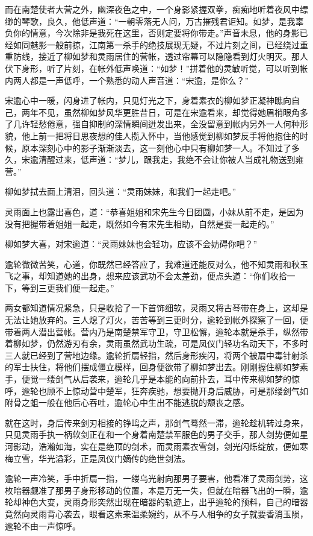 而在南楚使者大营之外，幽深夜色之中，一个身影紧握双拳，痴痴地听着夜风中缥缈的琴歌，良久，他低声道：“一朝零落无人问，万古摧残君讵知。如梦，是我辜负你的情意，今次除非是我死在这里，否则定要将你带走。”声音未息，他的身影已经如同魅影一般前掠，江南第一杀手的绝技展现无疑，不过片刻之间，已经绕过重重防线，接近了柳如梦和灵雨居住的营帐，透过帘幕可以隐隐看到灯火明灭。那人伏下身形，听了片刻，在帐外低声唤道：“如梦！”拼着他的灵敏听觉，可以听到帐内两人都是一声低呼，一个熟悉的动人声音道：“宋逾，是你么？”

宋逾心中一暖，闪身进了帐内，只见灯光之下，身着素衣的柳如梦正凝神瞧向自己，两年不见，虽然柳如梦风华更胜昔日，可是在宋逾看来，却觉得她眉梢眼角多了几许轻愁倦意，强自抑制的深情瞬间迸发出来，全没留意到帐内另外一人何种形貌，他上前一把将日思夜想的佳人揽入怀中，当他感觉到柳如梦反手将他抱住的时候，原本深刻心中的影子渐渐淡去，这一刻他心中只有柳如梦一人。不知过了多久，宋逾清醒过来，低声道：“梦儿，跟我走，我绝不会让你被人当成礼物送到雍营。”

柳如梦拭去面上清泪，回头道：“灵雨妹妹，和我们一起走吧。”

灵雨面上也露出喜色，道：“恭喜姐姐和宋先生今日团圆，小妹从前不走，是因为没有把握带着姐姐一起走，既然如今有宋先生相助，自然是要一起走的。”

柳如梦大喜，对宋逾道：“灵雨妹妹也会轻功，应该不会妨碍你吧？”

逾轮微微苦笑，心道，你既然已经答应了，我难道还能反对么，他不知灵雨和秋玉飞之事，却知道她的出身，想来应该武功不会太差劲，便点头道：“你们收拾一下，等到三更我们便一起走。”

两女都知道情况紧急，只是收拾了一下首饰细软，灵雨又将古琴带在身上，这却是无法让她放弃的。三人熄了灯火，苦苦等到三更时分，逾轮到帐外探察了一回，便带着两人潜出营帐。营内乃是南楚禁军守卫，守卫松懈，逾轮本就是杀手，纵然带着柳如梦，仍然游刃有余，灵雨虽然武功生疏，可是凤仪门轻功名动天下，不多时三人就已经到了营地边缘。逾轮折扇轻指，然后身形疾闪，将两个被扇中毒针射杀的军士扶住，将他们摆成僵立模样，回身便欲带了柳如梦出去。刚刚握住柳如梦素手，便觉一缕剑气从后袭来，逾轮几乎是本能的向前扑去，耳中传来柳如梦的惊呼，逾轮也顾不上惊动营中楚军，狂奔疾驰，想要抛开身后威胁，可是那缕剑气如附骨之蛆一般在他后心吞吐，逾轮心中生出不能逃脱的颓丧之感。

就在这时，身后传来剑刃相接的铮鸣之声，那剑气蓦然一滞，逾轮趁机转过身来，只见灵雨手执一柄软剑正在和一个身着南楚禁军服色的男子交手，那人剑势便如星河影动，浩瀚如海，实在是绝顶的剑术，而灵雨素衣雪剑，剑光闪烁绽放，便如寒梅立雪，华光溢彩，正是凤仪门嫡传的绝世剑法。

逾轮一声冷笑，手中折扇一指，一缕乌光射向那男子要害，他看准了灵雨剑势，这枚暗器觑准了那男子身形移动的位置，本是万无一失，但就在暗器飞出的一瞬，逾轮却神色大变，灵雨身形突然出现在暗器的轨迹上，出乎逾轮的预料，自己的暗器竟然向灵雨背心袭去，眼看这素来温柔婉约，从不与人相争的女子就要香消玉陨，逾轮不由一声惊呼。

